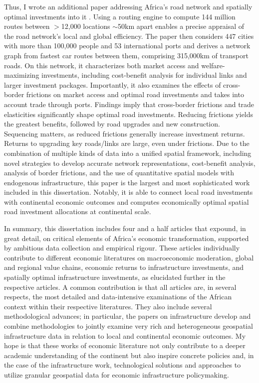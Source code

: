 \documentclass[a4paper]{article}
\begin{document}
Thus, I wrote an additional paper addressing Africa's road network and spatially optimal investments into it \citep{krantz2024optimal}. Using a routing engine to compute 144 million routes between $>$12,000 locations $\sim$50km apart enables a precise appraisal of the road network's local and global efficiency. The paper then considers 447 cities with more than 100,000 people and 53 international ports and derives a network graph from fastest car routes between them, comprising 315,000km of transport roads. On this network, it characterizes both market access and welfare-maximizing investments, including cost-benefit analysis for individual links and larger investment packages. Importantly, it also examines the effects of cross-border frictions on market access and optimal road investments and takes into account trade through ports. Findings imply that cross-border frictions and trade elasticities significantly shape optimal road investments. Reducing frictions yields the greatest benefits, followed by road upgrades and new construction. Sequencing matters, as reduced frictions generally increase investment returns. Returns to upgrading key roads/links are large, even under frictions. Due to the combination of multiple kinds of data into a unified spatial framework, including novel strategies to develop accurate network representations, cost-benefit analysis, analysis of border frictions, and the use of quantitative spatial models with endogenous infrastructure, this paper is the largest and most sophisticated work included in this dissertation. Notably, it is able to connect local road investments with continental economic outcomes and computes economically optimal spatial road investment allocations at continental scale. \newline

In summary, this dissertation includes four and a half articles that expound, in great detail, on critical elements of Africa's economic transformation, supported by ambitious data collection and empirical rigour. These articles individually contribute to different economic literatures on macroeconomic moderation, global and regional value chains, economic returns to infrastructure investments, and spatially optimal infrastructure investments, as elucidated further in the respective articles. A common contribution is that all articles are, in several respects, the most detailed and data-intensive examinations of the African context within their respective literatures. They also include several methodological advances; in particular, the papers on infrastructure develop and combine methodologies to jointly examine very rich and heterogeneous geospatial infrastructure data in relation to local and continental economic outcomes. My hope is that these works of economic literature not only contribute to a deeper academic understanding of the continent but also inspire concrete policies and, in the case of the infrastructure work, technological solutions and approaches to utilize granular geospatial data for economic infrastructure policymaking. 

\newpage


\end{document}
